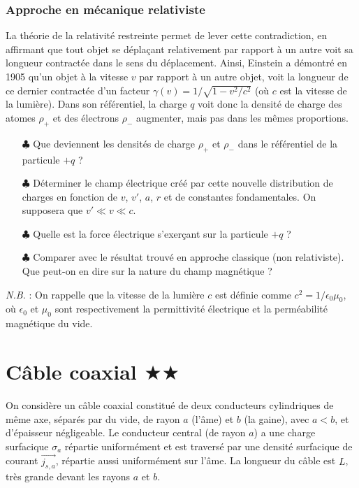 \documentclass{report}
\begin{document}
\subsubsection*{Approche en mécanique relativiste}

La théorie de la relativité restreinte permet de lever cette contradiction, en affirmant que tout objet se déplaçant relativement par rapport à un autre voit sa longueur contractée dans le sens du déplacement. Ainsi, Einstein a démontré en 1905 qu'un objet à la vitesse $v$ par rapport à un autre objet, voit la longueur de ce dernier contractée d'un facteur $\gamma(v)=1/\sqrt{1-v^{2}/c^{2}}$ (où $c$ est la vitesse de la lumière). Dans son référentiel, la charge $q$ voit donc la densité de charge des atomes $\rho_+$ et des électrons $\rho_-$ augmenter, mais pas dans les mêmes proportions. 
	\begin{itemize}
		\item[$\clubsuit$] Que deviennent les densités de charge $\rho_{+}$ et $\rho_{-}$ dans le référentiel de la particule $+q$ ? %
		\item[$\clubsuit$] Déterminer le champ électrique créé par cette nouvelle distribution de charges en fonction de $v$, $v'$, $a$, $r$ et de constantes fondamentales. On supposera que $v'\ll v\ll c$.
		\item[$\clubsuit$] Quelle est la force électrique s'exerçant sur la particule $+q$ ? 
		\item[$\clubsuit$] Comparer avec le résultat trouvé en approche classique (non relativiste). Que peut-on en dire sur la nature du champ magnétique ?
	\end{itemize}
			
\textit{N.B.} : On rappelle que la vitesse de la lumière $c$ est définie comme $c^{2}=1/\epsilon_{0}\mu_{0}$, où $\epsilon_{0}$ et $\mu_{0}$ sont respectivement la permittivité électrique et la perméabilité magnétique du vide.

\newpage

\section*{Câble coaxial $\bigstar\bigstar$}

On considère un câble coaxial constitué de deux conducteurs cylindriques de même axe, séparés par du vide, de rayon $a$ (l'âme) et $b$ (la gaine), avec $a<b$, et d'épaisseur négligeable. Le conducteur central (de rayon $a$) a une charge surfacique $\sigma_a$ répartie uniformément et est traversé par une densité surfacique de courant $\vec{j_{s,a}}$, répartie aussi uniformément sur l'âme. La longueur du câble est $L$, très grande devant les rayons $a$ et $b$.  
\end{document}
